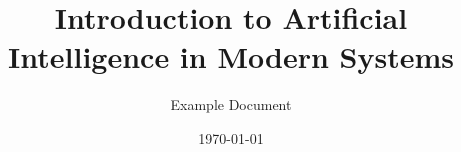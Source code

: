 \title{Introduction to Artificial Intelligence in Modern Systems}
\author{Example Document}
\date{\today}
 
\maketitle

\tableofcontents
   
\newpage  